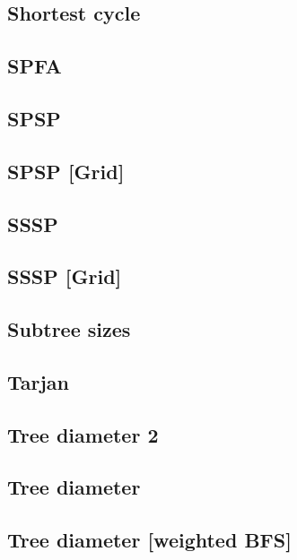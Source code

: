 \subsection{Shortest cycle}
\raggedbottom
\hrulefill
\subsection{SPFA}
\raggedbottom
\hrulefill
\subsection{SPSP}
\raggedbottom
\hrulefill
\subsection{SPSP [Grid]}
\raggedbottom
\hrulefill
\subsection{SSSP}
\raggedbottom
\hrulefill
\subsection{SSSP [Grid]}
\raggedbottom
\hrulefill
\subsection{Subtree sizes}
\raggedbottom
\hrulefill
\subsection{Tarjan}
\raggedbottom
\hrulefill
\subsection{Tree diameter 2}
\raggedbottom
\hrulefill
\subsection{Tree diameter}
\raggedbottom
\hrulefill
\subsection{Tree diameter [weighted BFS]}
\raggedbottom
\hrulefill
